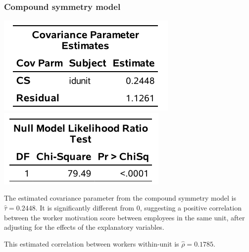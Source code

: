 \documentclass{beamer}
\begin{document}
 \begin{frame}
\frametitle{Compound symmetry model}
\begin{center}
\includegraphics[width = 0.42\linewidth]{img/c6/slides7-e08}
\includegraphics[width = 0.37\linewidth]{img/c6/slides7-e09}
\end{center}
\bi
\item The estimated covariance parameter from the compound symmetry model is $\hat{\tau} = 0.2448$. It is significantly different from $0$, suggesting a positive correlation between the worker motivation score between employees in the same unit, after adjusting for the effects of the explanatory variables. 
\item This estimated correlation between workers within-unit is $\hat{\rho} = 0.1785$. 
\ei
\end{frame}

% 
% 
\end{document}
